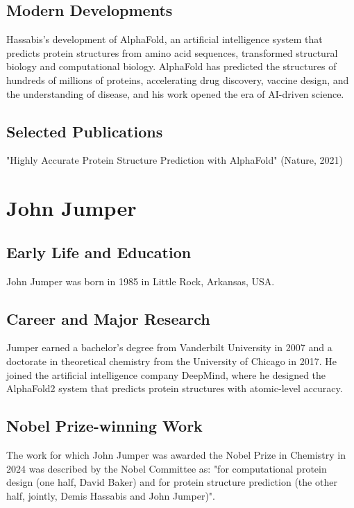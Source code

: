 \subsection*{Modern Developments}

Hassabis's development of AlphaFold, an artificial intelligence system that predicts protein structures from amino acid sequences, transformed structural biology and computational biology. AlphaFold has predicted the structures of hundreds of millions of proteins, accelerating drug discovery, vaccine design, and the understanding of disease, and his work opened the era of AI-driven science.

\subsection*{Selected Publications}

"Highly Accurate Protein Structure Prediction with AlphaFold" (Nature, 2021)

\clearpage

\section{John Jumper}

\subsection*{Early Life and Education}

John Jumper was born in 1985 in Little Rock, Arkansas, USA.

\subsection*{Career and Major Research}

Jumper earned a bachelor's degree from Vanderbilt University in 2007 and a doctorate in theoretical chemistry from the University of Chicago in 2017. He joined the artificial intelligence company DeepMind, where he designed the AlphaFold2 system that predicts protein structures with atomic-level accuracy.

\subsection*{Nobel Prize-winning Work}

The work for which John Jumper was awarded the Nobel Prize in Chemistry in 2024 was described by the Nobel Committee as: "for computational protein design (one half, David Baker) and for protein structure prediction (the other half, jointly, Demis Hassabis and John Jumper)".

